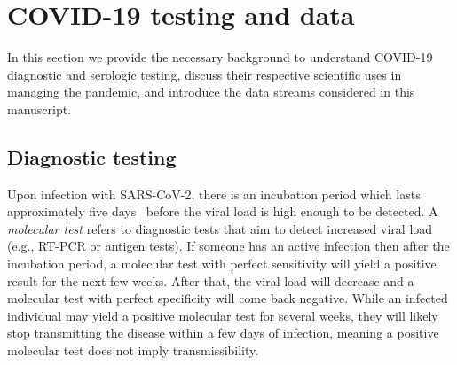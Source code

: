 \documentclass[11pt]{amsart}
\numberwithin{equation}{section}
\theoremstyle{plain}
\begin{document}



\section{COVID-19 testing and data}
\label{section:data}

In this section we provide the necessary background to understand COVID-19 diagnostic and serologic testing, discuss their respective scientific uses in managing the pandemic, and introduce the data streams considered in this manuscript.

\subsection{Diagnostic testing}
\label{section:testinginfo}


Upon infection with SARS-CoV-2, there is an incubation period which lasts approximately five days~\citep{Lauer2020} before the viral load is high enough to be detected.  A \emph{molecular test} refers to diagnostic tests that aim to detect increased viral load (e.g., RT-PCR or antigen tests).  If someone has an active infection then after the incubation period, a molecular test with perfect sensitivity will yield a positive result for the next few weeks.  After that, the viral load will decrease and a molecular test with perfect specificity will come back negative. While an infected individual may yield a positive molecular test for several weeks, they will likely stop transmitting the disease within a few days of infection, meaning a positive molecular test does not imply transmissibility.
\end{document}
